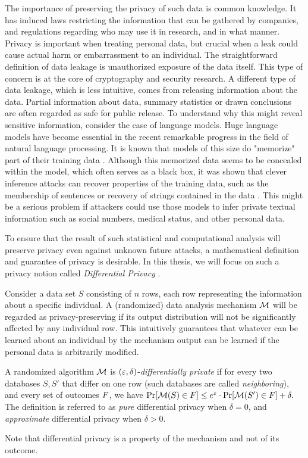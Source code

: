 \documentclass[12pt,a4paper,oneside,onecolumn]{book}
\begin{document}
The importance of preserving the privacy of such data is common knowledge. It has induced laws restricting the information that can be gathered by companies, and regulations regarding who may use it in research, and in what manner. Privacy is important when treating personal data, but crucial when a leak could cause actual harm or embarrassment to an individual.
The straightforward definition of data leakage is unauthorized exposure of the data itself. This type of concern is at the core of cryptography and security research. 
A different type of data leakage, which is less intuitive, comes from releasing information about the data. Partial information about data, summary statistics or drawn conclusions are often regarded as safe for public release. 
To understand why this might reveal sensitive information, consider the case of language models.
Huge language models have become essential in the recent remarkable progress in the field of natural language processing. It is known that models of this size do "memorize" part of their training data \citet{liu2020early, arpit2017closer}. 
Although this memorized data seems to be concealed within the model, which often serves as a black box, it was shown that clever inference attacks can recover properties of the training data, such as the membership of sentences or recovery of strings contained in the data \citep{DBLP:journals/corr/ShokriSS16, DBLP:journals/corr/abs-2012-07805}. 
This might be a serious problem if attackers could use those models to infer private textual information such as social numbers, medical status, and other personal data.

To ensure that the result of such statistical and computational analysis will preserve privacy even against unknown future attacks, a mathematical definition and guarantee of privacy is desirable.
In this thesis, we will focus on such a privacy notion called \emph{Differential Privacy} \citet{DMNS06}.

Consider a data set $S$ consisting of $n$ rows, each row representing the information about a specific individual.
A (randomized) data analysis mechanism $\mathcal{M}$ will be regarded as privacy-preserving if its output distribution will not be significantly affected by any individual row. This intuitively guarantees that whatever can be learned about an individual by the mechanism output can be learned if the personal data is arbitrarily modified.

\begin{definition}
\label{def:dp}
A randomized algorithm $\mathcal{M}$ is $(\varepsilon,\delta)$-{\em differentially private} if for every two databases $S,S'$ that differ on one row (such databases are called {\em neighboring}), and every set of outcomes $F$, we have
$\Pr[\mathcal{M}(S)\in F]\leq e^{\varepsilon}\cdot \Pr[\mathcal{M}(S')\in F]+\delta.$ 
The definition is referred to as {\em pure} differential privacy when $\delta=0$, and {\em approximate} differential privacy when $\delta>0$.
\end{definition}
Note that differential privacy is a property of the mechanism and not of its outcome. 
\end{document}
